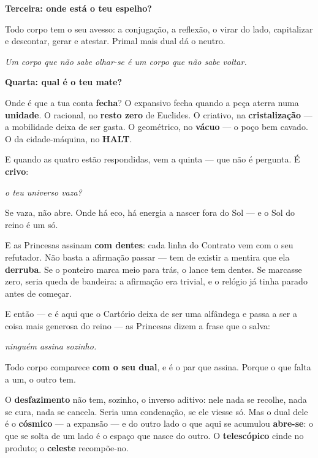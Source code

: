 \documentclass[livro.tex]{subfiles}
\begin{document}
\medskip\noindent\textbf{Terceira: onde está o teu espelho?}

Todo corpo tem o seu avesso: a conjugação, a reflexão, o virar do lado, capitalizar e descontar,
gerar e atestar. Primal mais dual dá o neutro.

\emph{Um corpo que não sabe olhar-se é um corpo que não sabe voltar.}

\medskip\noindent\textbf{Quarta: qual é o teu mate?}

Onde é que a tua conta \textbf{fecha}? O expansivo fecha quando a peça aterra numa \textbf{unidade}. O racional, no
\textbf{resto zero} de Euclides. O criativo, na \textbf{cristalização} --- a mobilidade deixa de ser gasta. O
geométrico, no \textbf{vácuo} --- o poço bem cavado. O da cidade-máquina, no \textbf{HALT}.

\medskip

E quando as quatro estão respondidas, vem a quinta --- que não é pergunta. É \textbf{crivo}:

\begin{center}\itshape
o teu universo vaza?
\end{center}

Se vaza, não abre. Onde há eco, há energia a nascer fora do Sol --- e o Sol do reino é um só.

E as Princesas assinam \textbf{com dentes}: cada linha do Contrato vem com o seu refutador. Não basta a afirmação
passar --- tem de existir a mentira que ela \textbf{derruba}. Se o ponteiro marca meio para trás, o lance tem dentes.
Se marcasse zero, seria queda de bandeira: a afirmação era trivial, e o relógio já tinha parado antes de começar.

\medskip

E então --- e é aqui que o Cartório deixa de ser uma alfândega e passa a ser a coisa mais generosa do reino --- as
Princesas dizem a frase que o salva:

\begin{center}\itshape
ninguém assina sozinho.
\end{center}

Todo corpo comparece \textbf{com o seu dual}, e é o par que assina. Porque o que falta a um, o outro tem.

O \textbf{desfazimento} não tem, sozinho, o inverso aditivo: nele nada se recolhe, nada se cura, nada se cancela. Seria
uma condenação, se ele viesse só. Mas o dual dele é o \textbf{cósmico} --- a expansão --- e do outro lado o que aqui
se acumulou \textbf{abre-se}: o que se solta de um lado é o espaço que nasce do outro. O \textbf{telescópico}
cinde no produto; o \textbf{celeste} recompõe-no.
\end{document}
